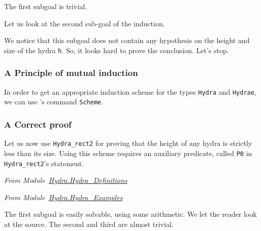 The first subgoal is trivial.



Let us look at the second sub-goal of the induction.



We notice that this subgoal does not contain any hypothesis
on the height and size of the hydra \texttt{h}. So, it looks hard to prove the conclusion. Let's stop.



\subsubsection{A Principle of mutual induction}
In order to get an appropriate induction scheme for the types 
\texttt{Hydra} and \texttt{Hydrae}, we can use  \coq{}'s  command \texttt{Scheme}.











\subsubsection{A Correct proof}

Let us now use \texttt{Hydra\_rect2} for proving that the height of any hydra is strictly less than its size.
Using this scheme requires an auxiliary predicate, called \texttt{P0} in \texttt{Hydra\_rect2}'s statement. 

\vspace{4pt}
\noindent
\emph{From Module~\href{../theories/html/hydras.Hydra.Hydra_Definitions.html}{Hydra.Hydra\_Definitions}}



\emph{From Module~\href{../theories/html/hydras.Hydra.Hydra_Examples.html}{Hydra.Hydra\_Examples}}






The first subgoal is easily solvable, using some arithmetic. We let the reader look at the source. The second and third are
almost trivial. 




